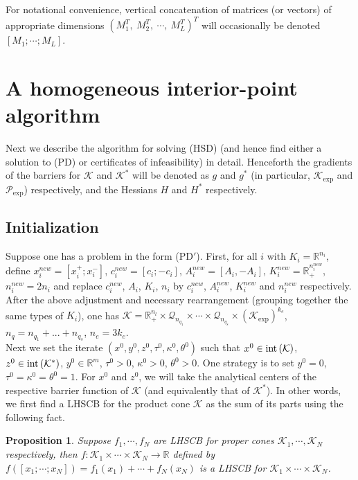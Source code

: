 \documentclass[10pt]{article}
\theoremstyle{definition}
\theoremstyle{plain}
\newtheorem{prop}{Proposition}
\def\interior{\protect{\textnormal{int}}}
\begin{document}
For notational convenience, vertical concatenation of matrices (or vectors) of appropriate dimensions $(M_1^T,\ M_2^T,\ \cdots,\ M_L^T)^T$ will occasionally be denoted $[M_1; \cdots ; M_L]$.

\section{A homogeneous interior-point algorithm}
Next we describe the algorithm for solving (HSD) (and hence find either a solution to (PD) or certificates of infeasibility) in detail. Henceforth the gradients of the barriers for $\mathcal{K}$ and $\mathcal{K}^*$ will be denoted as $g$ and $g^*$ (in particular, $\mathcal{K}_{\exp}$ and $\mathcal{P}_{\exp}$) respectively, and the Hessians $H$ and $H^*$ respectively.
\subsection{Initialization}

Suppose one has a problem in the form (PD$'$). First, for all $i$ with $K_i = \mathbb{R}^{n_i}$, define $x_i^{new} = [x_i^+; x_i^-]$, $c_i^{new} = [c_i; -c_i]$, $A_i^{new} = [A_i, -A_i]$, $K_i^{new} = \mathbb{R}_+^{n_i^{new}}$, $n_i^{new} = 2n_i$ and replace $c_i^{new}$, $A_i$, $K_i$, $n_i$ by $c_i^{new}$, $A_i^{new}$, $K_i^{new}$ and $n_i^{new}$ respectively. After the above adjustment and necessary rearrangement (grouping together the same types of $K_i$), one has $\mathcal{K} = \mathbb{R}_+^{n_l} \times \mathcal{Q}_{n_{q_1}} \times \cdots \times \mathcal{Q}_{n_{q_s}} \times \left(\mathcal{K}_{\exp}\right)^{k_e}$, $n_q = n_{q_1} + ... + n_{q_s}$, $n_e = 3k_e$. \\

Next we set the iterate $(x^0,y^0, z^0, \tau^0, \kappa^0, \theta^0)$ such that $x^0 \in \interior\left(\mathcal{K}\right)$, $z^0 \in \interior\left(\mathcal{K}^*\right)$, $y^0 \in \mathbb{R}^m$, $\tau^0 > 0$, $\kappa^0 > 0$, $\theta^0>0$. One strategy is to set $y^0 = 0$, $\tau^0 = \kappa^0 = \theta^0 = 1$. For $x^0$ and $z^0$, we will take the analytical centers of the respective barrier function of $\mathcal{K}$ (and equivalently that of $\mathcal{K}^*$). In other words, we first find a LHSCB for the product cone $\mathcal{K}$ as the sum of its parts using the following fact.
\begin{prop}
	Suppose $f_1, \cdots , f_N$ are LHSCB for proper cones $\mathcal{K}_1, \cdots, \mathcal{K}_N$ respectively, then $f: \mathcal{K}_1 \times\cdots\times \mathcal{K}_N \rightarrow \mathbb{R}$ defined by $f([x_1;\cdots; x_N]) = f_1(x_1) + \cdots + f_N(x_N)$ is a LHSCB for $\mathcal{K}_1 \times \cdots \times \mathcal{K}_N$.
\end{prop}
\end{document}
